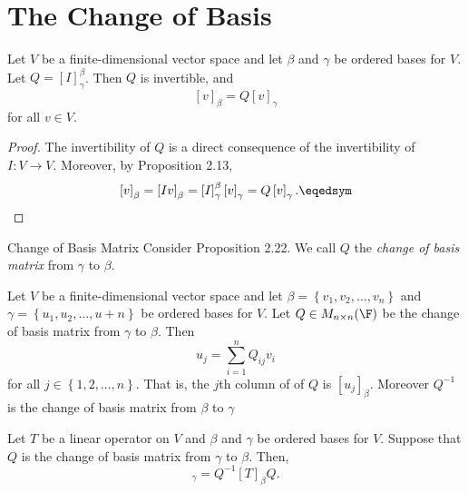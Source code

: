 \documentclass[linearalgebraI]{subfiles}
\begin{document}
    \clearpage
    \section{The Change of Basis}

    \begin{prop}{}
        Let $V$ be a finite-dimensional vector space and let $\beta$ and $\gamma$ be ordered bases for $V$. Let $Q=\left[ I \right] ^\beta_\gamma$. Then $Q$ is invertible, and
        \begin{equation*}
            \left[ v \right] _\beta = Q\left[ v \right] _\gamma
        \end{equation*}
        for all $v\in V$.
    \end{prop}

    \begin{proof}
        The invertibility of $Q$ is a direct consequence of the invertibility of $I:V\to V$. Moreover, by Proposition 2.13,
        \begin{equation*}
            \left[ v \right] _\beta = \left[ Iv \right] _\beta = \left[ I \right] ^\beta_\gamma\left[ v \right] _\gamma = Q\left[ v \right] _\gamma.\eqedsym
        \end{equation*}
    \end{proof}

    \begin{definition}{Change of Basis Matrix}{}
        Consider Proposition 2.22. We call $Q$ the \emph{change of basis matrix} from $\gamma$ to $\beta$.
    \end{definition}

    \begin{remark}
        Let $V$ be a finite-dimensional vector space and let $\beta = \left\lbrace v_1,v_2,\ldots,v_n \right\rbrace$ and $\gamma = \left\lbrace u_1,u_2,\ldots,u+n \right\rbrace$ be ordered bases for $V$. Let $Q\in M_{n\times n}(\F)$ be the change of basis matrix from $\gamma$ to $\beta$. Then
        \begin{equation*}
            u_j = \sum^{n}_{i=1} Q_{ij}v_i
        \end{equation*}
        for all $j\in \left\lbrace 1,2,\ldots,n \right\rbrace$. That is, the $j$th column of of $Q$ is $\left[ u_j \right] _\beta$. Moreover $Q^{-1} $ is the change of basis matrix from $\beta$ to $\gamma$
    \end{remark}

    \begin{prop}{}
        Let $T$ be a linear operator on $V$ and $\beta$ and $\gamma$ be ordered bases for $V$. Suppose that $Q$ is the change of basis matrix from $\gamma$ to $\beta$. Then,
        \begin{equation*}
            [T]_{\gamma} = Q^{-1} [T]_\beta Q.
        \end{equation*}
    \end{prop}
\end{document}
